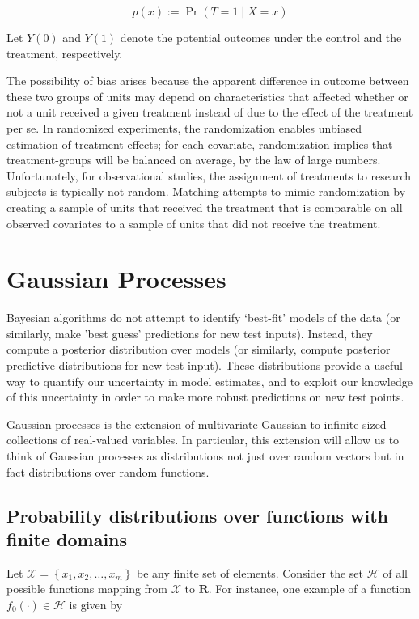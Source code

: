 \documentclass{article}
\begin{document}
$$p(x):= \Pr(T=1 \mid X=x)$$

Let $Y(0)$ and $Y(1)$ denote the potential outcomes under the control
and the treatment, respectively.

The possibility of bias arises because the apparent difference in outcome between these two groups of units may depend on characteristics that affected whether or not a unit received a given treatment instead of due to the effect of the treatment per se. In randomized experiments, the randomization enables unbiased estimation of treatment effects; for each covariate, randomization implies that treatment-groups will be balanced on average, by the law of large numbers. Unfortunately, for observational studies, the assignment of treatments to research subjects is typically not random. Matching attempts to mimic randomization by creating a sample of units that received the treatment that is comparable on all observed covariates to a sample of units that did not receive the treatment.


\section{Gaussian Processes}
Bayesian algorithms do not attempt to identify ‘best-fit’ models of the data (or similarly, make 'best guess' predictions for new test inputs). Instead, they compute a posterior distribution over models (or similarly, compute posterior predictive distributions for new test input). These distributions provide a useful way to quantify our uncertainty in model estimates, and to exploit our knowledge of this uncertainty in order to make more robust predictions on new test points.

Gaussian processes is the extension of multivariate Gaussian to infinite-sized collections of real-valued variables. In particular, this extension will allow us to think of Gaussian processes as distributions not just over random vectors but in fact distributions over random functions.

\subsection{Probability distributions over functions with finite domains}
Let $\mathcal{X} = \left \{ x_1, x_2, …, x_m \right \}$ be any finite set of elements. Consider the set $\mathcal{H}$ of all possible functions mapping from $\mathcal{X}$ to $\mathbf{R}$. For instance, one example of a function $f_0(\cdot) \in \mathcal{H}$ is given by
\end{document}
